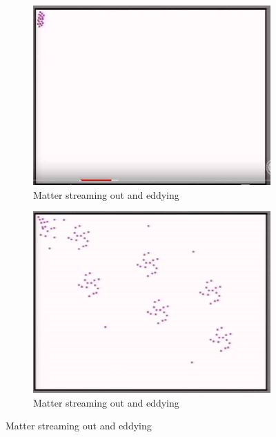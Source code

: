 \documentclass[]{article}
\begin{document}
\begin{figure}[H]
	\begin{center}
		\caption{Matter evolving from initial configuration}
		\begin{subfigure}[b]{0.3\textwidth}
			\caption{Matter streaming out and eddying}\label{fig:bolztmann-start}
			\includegraphics[width=\textwidth]{bolztmann-start}
		\end{subfigure}
		\begin{subfigure}[b]{0.3\textwidth}
			\caption{Matter streaming out and eddying}\label{fig:one_way_street-Boltzmann}
			\includegraphics[width=\textwidth]{one_way_street-Boltzmann}
		\end{subfigure}

\end{center}
\end{figure}
\end{document}
